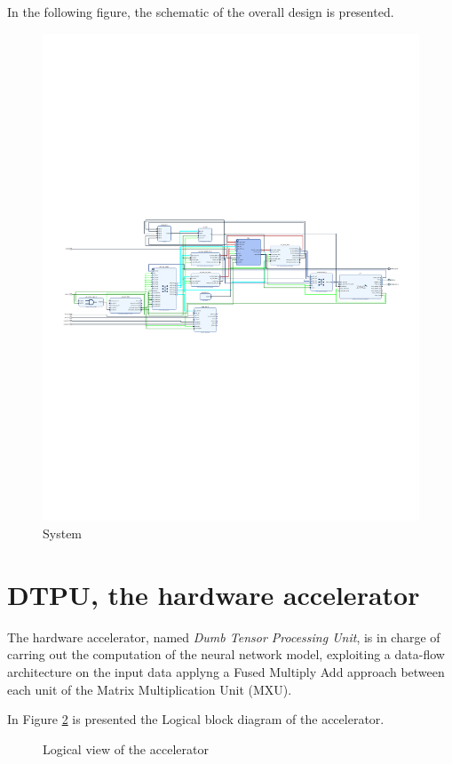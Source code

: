 \newpage
In the following figure, the schematic of the overall design is presented.
\begin{figure}[!htbp]
\centering
\captionsetup{justification=centering}
\includegraphics[scale=0.97,angle=90]{./figure/system_schematic.pdf}
\caption{System}
\label{fig:sys}
\end{figure}

\section{DTPU, the hardware accelerator}
The hardware accelerator, named \textit{ Dumb Tensor Processing Unit}, is in charge of carring out the computation of the neural network model, exploiting a data-flow architecture on the input data applyng a Fused Multiply Add approach between each unit of the Matrix Multiplication Unit (MXU).

In Figure \ref{fig:logaccel} is presented the Logical block diagram of the accelerator.
\begin{figure}[!htbp]
\centering
\captionsetup{justification=centering}
\caption{Logical view of the accelerator}
\label{fig:logaccel}
\end{figure}

